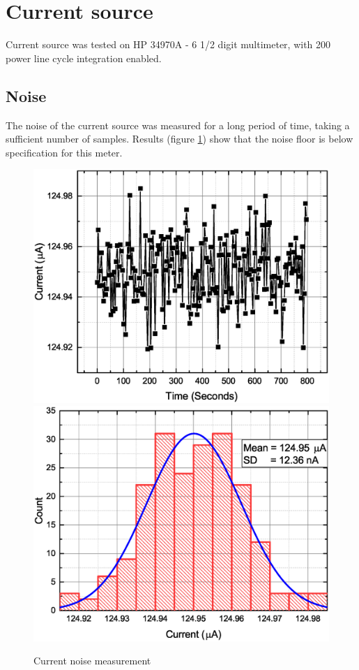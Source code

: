 \section{Current source}
    Current source was tested on HP 34970A - 6 1/2 digit multimeter, with 200 power line cycle integration enabled.

    \subsection{Noise}
        The noise of the current source was measured for a long period of time, taking a sufficient number of samples. Results (figure \ref{Current_Stability}) show that the noise floor is below specification for this meter.

        \begin{figure}[H]
            \centering
            \includegraphics[width=0.5\paperwidth]{img/07/current_time.eps}
            \includegraphics[width=0.5\paperwidth]{img/07/current_hist.eps}
            \caption{Current noise measurement}
            \label{Current_Stability}
        \end{figure}

